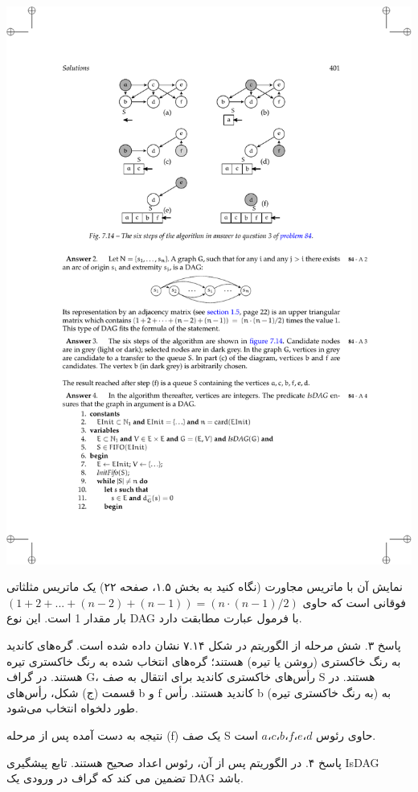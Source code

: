 \documentclass{book} %
\begin{document}
\begin{center}
    \includegraphics{./f2.pdf}
\end{center}

نمایش آن با ماتریس مجاورت (نگاه کنید به بخش ۱.۵، صفحه ۲۲) یک ماتریس مثلثاتی فوقانی است که حاوی $(1 + 2 + ... + (n - 2) + (n - 1)) = (n · (n - 1) / 2)$ بار مقدار 1 است. این نوع DAG با فرمول عبارت مطابقت دارد.

پاسخ ۳. شش مرحله از الگوریتم در شکل ۷.۱۴ نشان داده شده است. گره‌های کاندید
به رنگ خاکستری (روشن یا تیره) هستند؛ گره‌های انتخاب شده به رنگ خاکستری تیره هستند.
در گراف G، رأس‌های خاکستری کاندید برای انتقال به صف S هستند. در قسمت (ج) شکل،
رأس‌های b و f کاندید هستند. رأس b (به رنگ خاکستری تیره) به طور دلخواه انتخاب می‌شود.

نتیجه به دست آمده پس از مرحله (f) یک صف S حاوی رئوس $a، c، b، f، e، d$ است.

پاسخ ۴. در الگوریتم پس از آن، رئوس اعداد صحیح هستند. تابع پیشگیری IsDAG تضمین می کند که گراف در ورودی یک DAG باشد.
\end{document}
